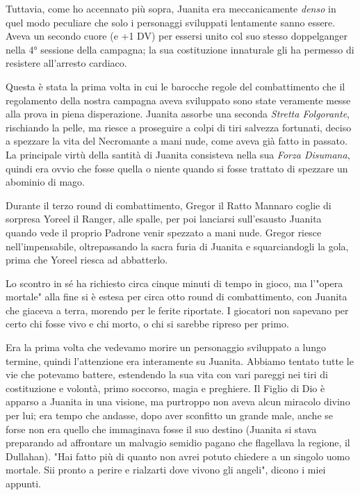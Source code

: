 Tuttavia, come ho accennato più sopra, Juanita era meccanicamente \textit{denso} in quel modo peculiare che solo i personaggi sviluppati lentamente sanno essere. Aveva un secondo cuore (e +1 DV) per essersi unito col suo stesso doppelganger nella 4° sessione della campagna; la sua costituzione innaturale gli ha permesso di resistere all'arresto cardiaco.

Questa è stata la prima volta in cui le barocche regole del combattimento che il regolamento della nostra campagna aveva sviluppato sono state veramente messe alla prova in piena disperazione. Juanita assorbe una seconda \textit{Stretta Folgorante}, rischiando la pelle, ma riesce a proseguire a colpi di tiri salvezza fortunati, deciso a spezzare la vita del Necromante a mani nude, come aveva già fatto in passato. La principale virtù della santità di Juanita consisteva nella sua \textit{Forza Disumana}, quindi era ovvio che fosse quella o niente quando si fosse trattato di spezzare un abominio di mago.

Durante il terzo round di combattimento, Gregor il Ratto Mannaro coglie di sorpresa Yoreel il Ranger, alle spalle, per poi lanciarsi sull'esausto Juanita quando vede il proprio Padrone venir spezzato a mani nude. Gregor riesce nell'impensabile, oltrepassando la sacra furia di Juanita e squarciandogli la gola, prima che Yoreel riesca ad abbatterlo.

Lo scontro in sé ha richiesto circa cinque minuti di tempo in gioco, ma l'"opera mortale" alla fine si è estesa per circa otto round di combattimento, con Juanita che giaceva a terra, morendo per le ferite riportate. I giocatori non sapevano per certo chi fosse vivo e chi morto, o chi si sarebbe ripreso per primo.

Era la prima volta che vedevamo morire un personaggio sviluppato a lungo termine, quindi l'attenzione era interamente su Juanita. Abbiamo tentato tutte le vie che potevamo battere, estendendo la sua vita con vari pareggi nei tiri di costituzione e volontà, primo soccorso, magia e preghiere. Il Figlio di Dio è apparso a Juanita in una visione, ma purtroppo non aveva alcun miracolo divino per lui; era tempo che andasse, dopo aver sconfitto un grande male, anche se forse non era quello che immaginava fosse il suo destino (Juanita si stava preparando ad affrontare un malvagio semidio pagano che flagellava la regione, il Dullahan). "Hai fatto più di quanto non avrei potuto chiedere a un singolo uomo mortale. Sii pronto a perire e rialzarti dove vivono gli angeli", dicono i miei appunti.

